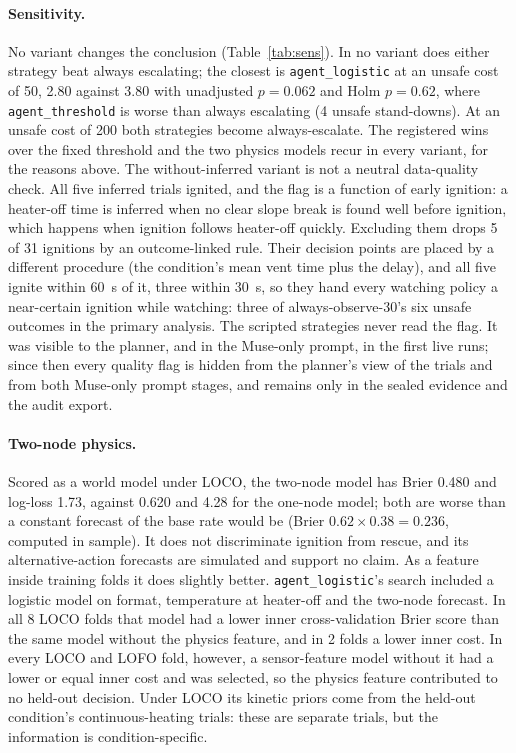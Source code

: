 \documentclass[11pt]{article}
\begin{document}
\paragraph{Sensitivity.} No variant changes the conclusion (Table~\ref{tab:sens}). In no variant does either strategy
beat always escalating; the closest is \texttt{agent\_logistic} at an unsafe cost of 50, 2.80 against 3.80 with
unadjusted $p = 0.062$ and Holm $p = 0.62$, where \texttt{agent\_threshold} is worse than always escalating (4 unsafe
stand-downs). At an unsafe cost of 200 both strategies become always-escalate. The registered wins over the fixed
threshold and the two physics models recur in every variant, for the reasons above. The without-inferred variant is
not a neutral data-quality check. All five inferred trials ignited, and the flag is a function of early ignition: a
heater-off time is inferred when no clear slope break is found well before ignition, which happens when ignition
follows heater-off quickly. Excluding them drops 5 of 31 ignitions by an outcome-linked rule. Their decision points are
placed by a different procedure (the condition's mean vent time plus the delay), and all five ignite within 60~s of
it, three within 30~s, so they hand every watching policy a near-certain ignition while watching: three of
always-observe-30's six unsafe outcomes in the primary analysis. The scripted strategies never read the flag. It was visible to the planner, and in the
Muse-only prompt, in the first live runs; since then every quality flag is hidden from the planner's view of the
trials and from both Muse-only prompt stages, and remains only in the sealed evidence and the audit export.

\paragraph{Two-node physics.} Scored as a world model under LOCO, the two-node model has Brier 0.480 and log-loss 1.73,
against 0.620 and 4.28 for the one-node model; both are worse than a constant forecast of the base rate would be
(Brier $0.62 \times 0.38 = 0.236$, computed in sample). It does not discriminate ignition from rescue, and its
alternative-action forecasts are simulated and support no claim. As a feature inside training folds it does slightly
better. \texttt{agent\_logistic}'s search included a logistic model on format, temperature at heater-off and the
two-node forecast. In all 8 LOCO folds that model had a lower inner cross-validation Brier score than the same model
without the physics feature, and in 2 folds a lower inner cost. In every LOCO and LOFO fold, however, a sensor-feature model
without it had a lower or equal inner cost and was selected, so the physics feature contributed to no held-out
decision. Under LOCO its kinetic priors come from the held-out condition's continuous-heating trials: these are
separate trials, but the information is condition-specific.
\end{document}
